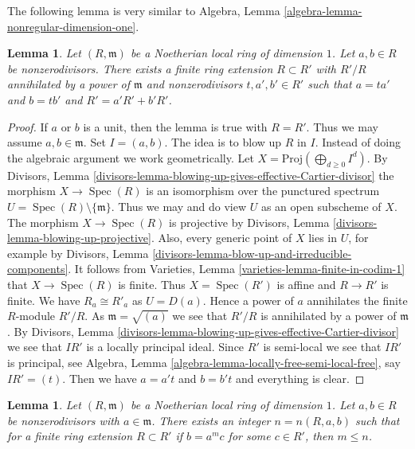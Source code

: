 \documentclass[10pt,a4paper]{amsart}
\theoremstyle{plain}
\newtheorem{lemma}[subsection]{Lemma}
\theoremstyle{definition}
\theoremstyle{remark}
\numberwithin{equation}{subsection}
\def\Spec{\mathop{\mathrm{Spec}}}
\begin{document}
\noindent
The following lemma is very similar to
Algebra, Lemma \ref{algebra-lemma-nonregular-dimension-one}.

\begin{lemma}
\label{lemma-Noetherian-domain-dim-1-two-elements}
Let $(R, \mathfrak m)$ be a Noetherian local ring of dimension $1$.
Let $a, b \in R$ be nonzerodivisors.
There exists a finite ring extension $R \subset R'$
with $R'/R$ annihilated by a power of $\mathfrak m$
and nonzerodivisors $t, a', b' \in R'$ such that
$a = ta'$ and $b = tb'$ and $R' = a'R' + b'R'$.
\end{lemma}

\begin{proof}
If $a$ or $b$ is a unit, then the lemma is true with $R = R'$.
Thus we may assume $a, b \in \mathfrak m$.
Set $I = (a, b)$. The idea is to blow up $R$ in $I$.
Instead of doing the algebraic argument we work geometrically.
Let $X = \text{Proj}(\bigoplus_{d \geq 0} I^d)$.
By Divisors, Lemma
\ref{divisors-lemma-blowing-up-gives-effective-Cartier-divisor}
the morphism $X \to \Spec(R)$ is an isomorphism over
the punctured spectrum $U = \Spec(R) \setminus \{\mathfrak m\}$.
Thus we may and do view $U$ as an open subscheme of $X$.
The morphism $X \to \Spec(R)$ is projective by
Divisors, Lemma \ref{divisors-lemma-blowing-up-projective}.
Also, every generic point of $X$ lies in $U$, for example
by Divisors, Lemma \ref{divisors-lemma-blow-up-and-irreducible-components}.
It follows from Varieties, Lemma \ref{varieties-lemma-finite-in-codim-1}
that $X \to \Spec(R)$ is finite. Thus $X = \Spec(R')$ is
affine and $R \to R'$ is finite. We have $R_a \cong R'_a$ as $U = D(a)$.
Hence a power of $a$ annihilates the finite $R$-module $R'/R$.
As $\mathfrak m = \sqrt{(a)}$ we see that $R'/R$ is annihilated
by a power of $\mathfrak m$. By
Divisors, Lemma \ref{divisors-lemma-blowing-up-gives-effective-Cartier-divisor}
we see that $IR'$ is a locally principal ideal.
Since $R'$ is semi-local we see that $IR'$ is principal,
see Algebra, Lemma \ref{algebra-lemma-locally-free-semi-local-free},
say $IR' = (t)$. Then we have $a = a't$ and $b = b't$ and everything is
clear.
\end{proof}

\begin{lemma}
\label{lemma-not-infinitely-divisible}
Let $(R, \mathfrak m)$ be a Noetherian local ring of dimension $1$.
Let $a, b \in R$ be nonzerodivisors with $a \in \mathfrak m$.
There exists an integer $n = n(R, a, b)$ such that for a finite ring
extension $R \subset R'$ if $b = a^m c$ for some $c \in R'$, then $m \leq n$.
\end{lemma}
\end{document}
